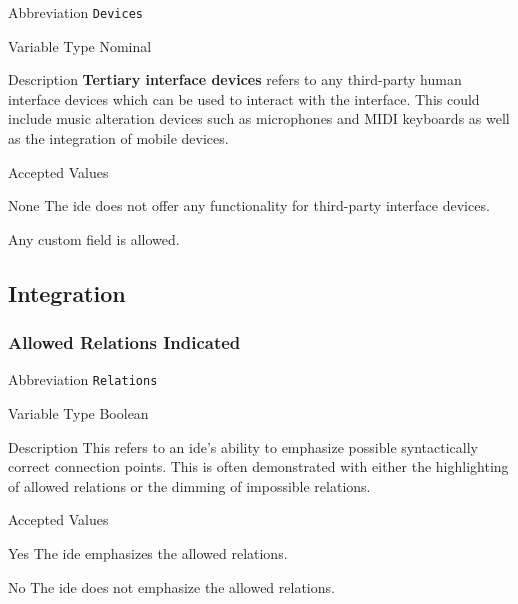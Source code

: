 \begin{AlignedDesc}
  \item[Abbreviation] \texttt{Devices}

  \item[Variable Type] Nominal

  \item[Description] \textbf{Tertiary interface devices} refers to any
  third-party human interface devices which can be used to interact with
  the interface.  This could include music alteration devices such as
  microphones and MIDI keyboards as well as the integration of mobile
  devices.

  \item[Accepted Values]

  \begin{AlignedDesc}
    \item[None] The \ac{ide} does not offer any functionality for
    third-party interface devices.
    \item[\textellipsis] Any custom field is allowed.
  \end{AlignedDesc}

\end{AlignedDesc}


\subsection{Integration}
\label{sec:integration}

\subsubsection{Allowed Relations Indicated}
\label{subsec:relations}

\begin{AlignedDesc}
  \item[Abbreviation] \texttt{Relations}

  \item[Variable Type] Boolean

  \item[Description] This refers to an \ac{ide}'s ability to emphasize possible syntactically correct connection points. This is often demonstrated with either the highlighting of allowed relations or the dimming of impossible relations.

  \item[Accepted Values]

  \begin{AlignedDesc}
    \item[Yes] The \ac{ide} emphasizes the allowed relations.
		\item[No] The \ac{ide} does not emphasize the allowed relations.
  \end{AlignedDesc}

\end{AlignedDesc}

